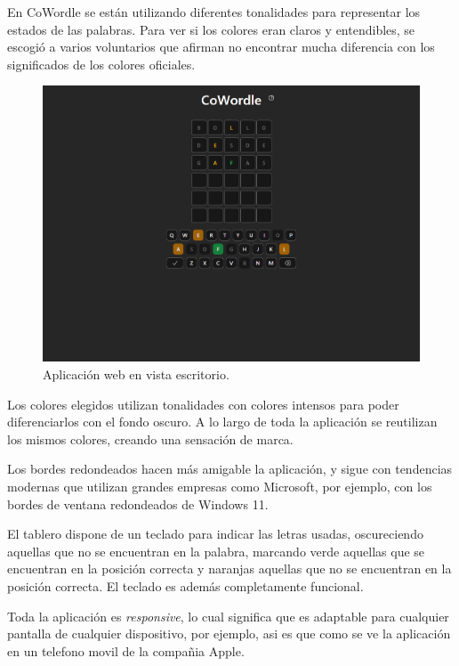 En CoWordle se están utilizando diferentes tonalidades para representar los estados de las palabras. Para ver si los colores eran claros y entendibles, se escogió a varios voluntarios que afirman no encontrar mucha diferencia con los significados de los colores oficiales.

\begin{figure}[H]
	\centering
	\includegraphics[clip=true,width=\textwidth]{./images/design/cowordle_desktop.png}
	\caption{Aplicación web en vista escritorio.}
	\label{fig:web_desktop}
\end{figure}

Los colores elegidos utilizan tonalidades con colores intensos para poder diferenciarlos con el fondo oscuro. A lo largo de toda la aplicación se reutilizan los mismos colores, creando una sensación de marca.

Los bordes redondeados hacen más amigable la aplicación, y sigue con tendencias modernas que utilizan grandes empresas como Microsoft, por ejemplo, con los bordes de ventana redondeados de Windows 11.

El tablero dispone de un teclado para indicar las letras usadas, oscureciendo aquellas que no se encuentran en la palabra, marcando verde aquellas que se encuentran en la posición correcta y naranjas aquellas que no se encuentran en la posición correcta. El teclado es además completamente funcional.

Toda la aplicación es \textit{responsive}, lo cual significa que es adaptable para cualquier pantalla de cualquier dispositivo, por ejemplo, asi es que como se ve la aplicación en un telefono movil de la compañia Apple.

